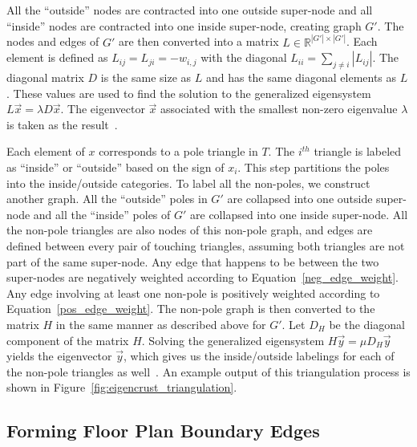 \documentclass[12pt,onecolumn,oneside]{book}
\begin{document}
All the ``outside'' nodes are contracted into one outside super-node and all ``inside'' nodes are contracted into one inside super-node, creating graph $G'$.  The nodes and edges of $G'$ are then converted into a matrix $L \in \mathbb{R}^{|G'| \times |G'|}$.  Each element is defined as $L_{ij} = L_{ji} = -w_{i,j}$ with the diagonal $L_{ii} = \sum_{j \neq i} |L_{ij}|$.  The diagonal matrix $D$ is the same size as $L$ and has the same diagonal elements as $L$.  These values are used to find the solution to the generalized eigensystem $L \vec{x} = \lambda D \vec{x}$.  The eigenvector $\vec{x}$ associated with the smallest non-zero eigenvalue $\lambda$ is taken as the result~\cite{EigencrustShewchuk}.

Each element of $x$ corresponds to a pole triangle in $T$.  The $i^{th}$ triangle is labeled as ``inside'' or ``outside'' based on the sign of $x_i$.  This step partitions the poles into the inside/outside categories.  To label all the non-poles, we construct another graph.  All the ``outside'' poles in $G'$ are collapsed into one outside super-node and all the ``inside'' poles of $G'$ are collapsed into one inside super-node.  All the non-pole triangles are also nodes of this non-pole graph, and edges are defined between every pair of touching triangles, assuming both triangles are not part of the same super-node. Any edge that happens to be between the two super-nodes are negatively weighted according to Equation~\ref{neg_edge_weight}.  Any edge involving at least one non-pole is positively weighted according to Equation~\ref{pos_edge_weight}.  The non-pole graph is then converted to the matrix $H$ in the same manner as described above for $G'$.  Let $D_H$ be the diagonal component of the matrix $H$.  Solving the generalized eigensystem $H \vec{y} = \mu D_H \vec{y}$ yields the eigenvector $\vec{y}$, which gives us the inside/outside labelings for each of the non-pole triangles as well~\cite{EigencrustShewchuk}. An example output of this triangulation process is shown in Figure~\ref{fig:eigencrust_triangulation}.

\subsection{Forming Floor Plan Boundary Edges}
\label{ssec:eigencrust_boundary}
\end{document}

